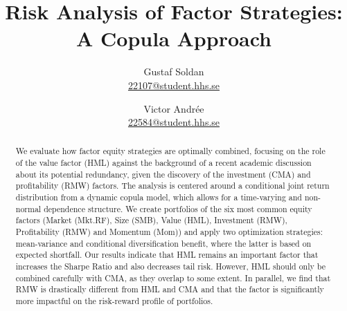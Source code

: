 
\begin{titlepage}
  \title{Risk Analysis of Factor Strategies:\\A Copula Approach}
  \author{
    Gustaf Soldan \\ \href{mailto:22107@student.hhs.se}{22107@student.hhs.se}\and
    Victor Andrée \\ \href{mailto:22584@student.hhs.se}{22584@student.hhs.se}
  }

  \maketitle

  \begin{abstract}
    \noindent We evaluate how factor equity strategies are optimally combined, focusing on the role of the value factor (HML) against the background of a recent academic discussion about its potential redundancy, given the discovery of the investment (CMA) and profitability (RMW) factors. The analysis is centered around a conditional joint return distribution from a dynamic copula model, which allows for a time-varying and non-normal dependence structure. We create portfolios of the six most common equity factors (Market (Mkt.RF), Size (SMB), Value (HML), Investment (RMW), Profitability (RMW) and Momentum (Mom)) and apply two optimization strategies: mean-variance and conditional diversification benefit, where the latter is based on expected shortfall. Our results indicate that HML remains an important factor that increases the Sharpe Ratio and also decreases tail risk. However, HML should only be combined carefully with CMA, as they overlap to some extent. In parallel, we find that RMW is drastically different from HML and CMA and that the factor is significantly more impactful on the risk-reward profile of portfolios.
  \end{abstract}

  \thispagestyle{empty}
\end{titlepage}
